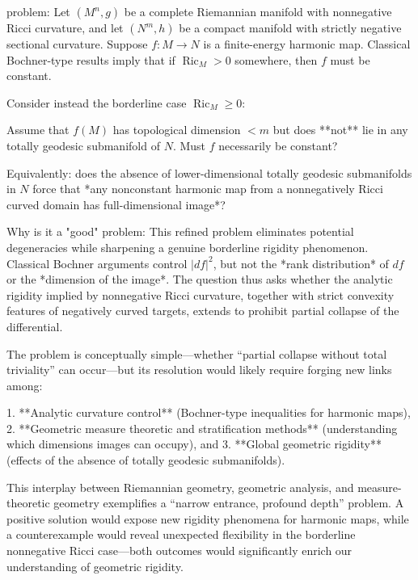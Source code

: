 problem:  
Let \((M^n,g)\) be a complete Riemannian manifold with nonnegative Ricci curvature, and let \((N^m,h)\) be a compact manifold with strictly negative sectional curvature. Suppose \(f:M\to N\) is a finite-energy harmonic map. Classical Bochner-type results imply that if \(\operatorname{Ric}_M>0\) somewhere, then \(f\) must be constant.  

Consider instead the borderline case \(\operatorname{Ric}_M\ge 0\):  

Assume that \(f(M)\) has topological dimension \(<m\) but does **not** lie in any totally geodesic submanifold of \(N\). Must \(f\) necessarily be constant?  

Equivalently: does the absence of lower-dimensional totally geodesic submanifolds in \(N\) force that *any nonconstant harmonic map from a nonnegatively Ricci curved domain has full-dimensional image*?  

Why is it a "good" problem:  
This refined problem eliminates potential degeneracies while sharpening a genuine borderline rigidity phenomenon. Classical Bochner arguments control \(|df|^2\), but not the *rank distribution* of \(df\) or the *dimension of the image*. The question thus asks whether the analytic rigidity implied by nonnegative Ricci curvature, together with strict convexity features of negatively curved targets, extends to prohibit partial collapse of the differential.  

The problem is conceptually simple—whether “partial collapse without total triviality” can occur—but its resolution would likely require forging new links among:  

1. **Analytic curvature control** (Bochner-type inequalities for harmonic maps),  
2. **Geometric measure theoretic and stratification methods** (understanding which dimensions images can occupy), and  
3. **Global geometric rigidity** (effects of the absence of totally geodesic submanifolds).  

This interplay between Riemannian geometry, geometric analysis, and measure-theoretic geometry exemplifies a “narrow entrance, profound depth” problem. A positive solution would expose new rigidity phenomena for harmonic maps, while a counterexample would reveal unexpected flexibility in the borderline nonnegative Ricci case—both outcomes would significantly enrich our understanding of geometric rigidity.